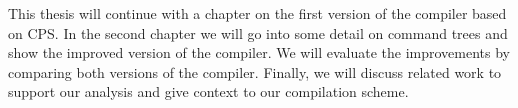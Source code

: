 This thesis will continue with a chapter on the first version of the compiler based on CPS. In the second chapter we will go into some detail on command trees and show the improved version of the compiler. We will evaluate the improvements by comparing both versions of the compiler. Finally, we will discuss related work to support our analysis and give context to our compilation scheme.
